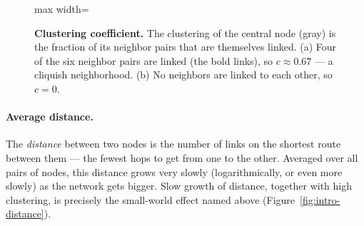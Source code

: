 \begin{figure}[t]
\centering
\begin{adjustbox}{max width=\linewidth}\end{adjustbox}
\caption{\textbf{Clustering coefficient.} The clustering of the central node
(gray) is the fraction of its neighbor pairs that are themselves linked. (a) Four
of the six neighbor pairs are linked (the bold links), so $c\approx0.67$ --- a
cliquish neighborhood. (b) No neighbors are linked to each other, so
$c=0$.}
\label{fig:intro-clustering}
\end{figure}

\paragraph{Average distance.}
The \emph{distance} between two nodes is the number of links on the shortest
route between them --- the fewest hops to get from one to the other. Averaged
over all pairs of nodes, this distance grows very slowly (logarithmically, or
even more slowly) as the network gets bigger. Slow growth of distance, together
with high clustering, is precisely the small-world effect named above
(Figure~\ref{fig:intro-distance}).

